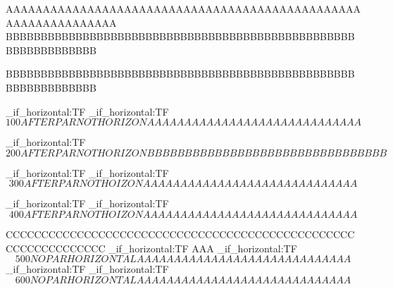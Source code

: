 AAAAAAAAAAAAAAAAAAAAAAAAAAAAAAAAAAAAAAAAAAAAAAAAAAAAAAAAAAAAAAA\\
BBBBBBBBBBBBBBBBBBBBBBBBBBBBBBBBBBBBBBBBBBBBBBBBBBBBBBBBBBBBBBB
\par
BBBBBBBBBBBBBBBBBBBBBBBBBBBBBBBBBBBBBBBBBBBBBBBBBBBBBBBBBBBBBBB
\par
\ExplSyntaxOn\mode_if_horizontal:TF{}{}\ExplSyntaxOff
\ExplSyntaxOn\mode_if_horizontal:TF{}{\vspace{-1.5em}}\ExplSyntaxOff
$$100 AFTER PAR NOT HORIZON AAAAAAAAAAAAAAAAAAAAAAAAAAAAA$$
\par
\ExplSyntaxOn\mode_if_horizontal:TF{}{}\ExplSyntaxOff
$200 AFTER PAR NOT HORIZON BBBBBBBBBBBBBBBBBBBBBBBBBBBBBBBB$
\par
\ExplSyntaxOn\mode_if_horizontal:TF{}{}\ExplSyntaxOff
\ExplSyntaxOn\mode_if_horizontal:TF{}{\vspace{-1.5em}}\ExplSyntaxOff
$$300 AFTER PAR NOT HOIZON AAAAAAAAAAAAAAAAAAAAAAAAAAAAA$$
\par
\ExplSyntaxOn\mode_if_horizontal:TF{}{}\ExplSyntaxOff
\typeout{\the\abovedisplayskip}
\ExplSyntaxOn\mode_if_horizontal:TF{}{\vspace{-1.5em}}\ExplSyntaxOff
$$400 AFTER PAR NOT HOIZON AAAAAAAAAAAAAAAAAAAAAAAAAAAAA$$
\par
CCCCCCCCCCCCCCCCCCCCCCCCCCCCCCCCCCCCCCCCCCCCCCCCCCCCCCCCCCCCCCC
\ExplSyntaxOn\mode_if_horizontal:TF{}{}\ExplSyntaxOff
AAA
\ExplSyntaxOn\mode_if_horizontal:TF{}{\vspace{-1.5em}}\ExplSyntaxOff
$$500 NO PAR HORIZONTAL AAAAAAAAAAAAAAAAAAAAAAAAAAAAA$$
\ExplSyntaxOn\mode_if_horizontal:TF{}{}\ExplSyntaxOff
\ExplSyntaxOn\mode_if_horizontal:TF{}{\vspace{-1.5em}}\ExplSyntaxOff
$$600 NO PAR HORIZONTAL AAAAAAAAAAAAAAAAAAAAAAAAAAAAA$$


